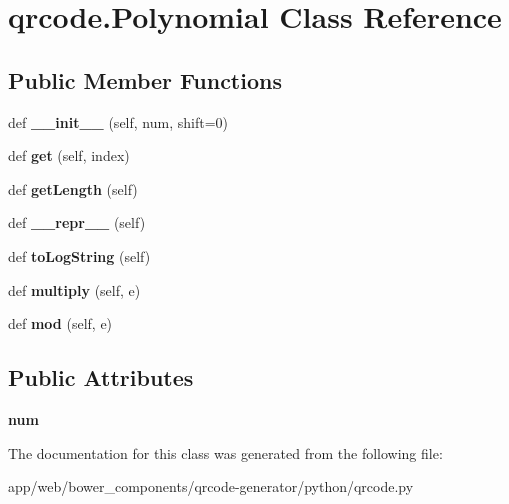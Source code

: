 \hypertarget{classqrcode_1_1_polynomial}{}\section{qrcode.\+Polynomial Class Reference}
\label{classqrcode_1_1_polynomial}
\subsection*{Public Member Functions}
\begin{DoxyCompactItemize}
\item 
\mbox{\label{classqrcode_1_1_polynomial_a9cddb957a8eddf6a4a13a4dfca757a62}} 
def {\bfseries \+\_\+\+\_\+init\+\_\+\+\_\+} (self, num, shift=0)
\item 
\mbox{\label{classqrcode_1_1_polynomial_a7d49d9ab4cf1670c9cab62e4695131d2}} 
def {\bfseries get} (self, index)
\item 
\mbox{\label{classqrcode_1_1_polynomial_a1378d1804daea4d56519960b63b5fce0}} 
def {\bfseries get\+Length} (self)
\item 
\mbox{\label{classqrcode_1_1_polynomial_a1f08f9004eb728937a83f4b43e979291}} 
def {\bfseries \+\_\+\+\_\+repr\+\_\+\+\_\+} (self)
\item 
\mbox{\label{classqrcode_1_1_polynomial_aa064ab918e248e62e0ab3861340cab8c}} 
def {\bfseries to\+Log\+String} (self)
\item 
\mbox{\label{classqrcode_1_1_polynomial_adf7d10ef65b8e985308eb9b5ed790a15}} 
def {\bfseries multiply} (self, e)
\item 
\mbox{\label{classqrcode_1_1_polynomial_a1b06b8a3bb27900363572d0a57070285}} 
def {\bfseries mod} (self, e)
\end{DoxyCompactItemize}
\subsection*{Public Attributes}
\begin{DoxyCompactItemize}
\item 
\mbox{\label{classqrcode_1_1_polynomial_a974d4001ecc1e09b68f380b408c1a36a}} 
{\bfseries num}
\end{DoxyCompactItemize}


The documentation for this class was generated from the following file\+:\begin{DoxyCompactItemize}
\item 
app/web/bower\+\_\+components/qrcode-\/generator/python/qrcode.\+py\end{DoxyCompactItemize}
